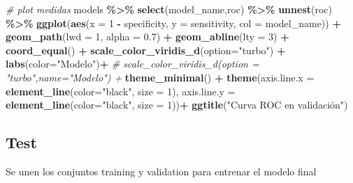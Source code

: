 \documentclass[12pt,a4paper,]{book}
\newenvironment{Shaded}{\begin{snugshade}}{\end{snugshade}}
\newcommand{\AttributeTok}[1]{\textcolor[rgb]{0.13,0.29,0.53}{#1}}
\newcommand{\CommentTok}[1]{\textcolor[rgb]{0.56,0.35,0.01}{\textit{#1}}}
\newcommand{\DecValTok}[1]{\textcolor[rgb]{0.00,0.00,0.81}{#1}}
\newcommand{\FloatTok}[1]{\textcolor[rgb]{0.00,0.00,0.81}{#1}}
\newcommand{\FunctionTok}[1]{\textcolor[rgb]{0.13,0.29,0.53}{\textbf{#1}}}
\newcommand{\NormalTok}[1]{#1}
\newcommand{\SpecialCharTok}[1]{\textcolor[rgb]{0.81,0.36,0.00}{\textbf{#1}}}
\newcommand{\StringTok}[1]{\textcolor[rgb]{0.31,0.60,0.02}{#1}}
\numberwithin{dummy}{section}
\theoremstyle{ocrenumbox}
\theoremstyle{blacknumex}
\theoremstyle{blacknumbox}
\theoremstyle{ocrenum}
\theoremstyle{ocrenum}
\begin{document}
\begin{Shaded}
\begin{Highlighting}[]
\CommentTok{\# plot medidas}
\NormalTok{models }\SpecialCharTok{\%\textgreater{}\%} \FunctionTok{select}\NormalTok{(model\_name,roc) }\SpecialCharTok{\%\textgreater{}\%} \FunctionTok{unnest}\NormalTok{(roc) }\SpecialCharTok{\%\textgreater{}\%} 
  \FunctionTok{ggplot}\NormalTok{(}\FunctionTok{aes}\NormalTok{(}\AttributeTok{x =} \DecValTok{1} \SpecialCharTok{{-}}\NormalTok{ specificity, }\AttributeTok{y =}\NormalTok{ sensitivity, }\AttributeTok{col =}\NormalTok{ model\_name)) }\SpecialCharTok{+} 
  \FunctionTok{geom\_path}\NormalTok{(}\AttributeTok{lwd =} \DecValTok{1}\NormalTok{, }\AttributeTok{alpha =} \FloatTok{0.7}\NormalTok{) }\SpecialCharTok{+}
  \FunctionTok{geom\_abline}\NormalTok{(}\AttributeTok{lty =} \DecValTok{3}\NormalTok{) }\SpecialCharTok{+} 
  \FunctionTok{coord\_equal}\NormalTok{() }\SpecialCharTok{+} 
  \FunctionTok{scale\_color\_viridis\_d}\NormalTok{(}\AttributeTok{option=}\StringTok{"turbo"}\NormalTok{) }\SpecialCharTok{+}
  \FunctionTok{labs}\NormalTok{(}\AttributeTok{color=}\StringTok{"Modelo"}\NormalTok{)}\SpecialCharTok{+}
  \CommentTok{\# scale\_color\_viridis\_d(option = "turbo",name="Modelo") +}
  \FunctionTok{theme\_minimal}\NormalTok{() }\SpecialCharTok{+} 
  \FunctionTok{theme}\NormalTok{(}\AttributeTok{axis.line.x =} \FunctionTok{element\_line}\NormalTok{(}\AttributeTok{color=}\StringTok{"black"}\NormalTok{, }\AttributeTok{size =} \DecValTok{1}\NormalTok{),}
        \AttributeTok{axis.line.y =} \FunctionTok{element\_line}\NormalTok{(}\AttributeTok{color=}\StringTok{"black"}\NormalTok{, }\AttributeTok{size =} \DecValTok{1}\NormalTok{))}\SpecialCharTok{+}
  \FunctionTok{ggtitle}\NormalTok{(}\StringTok{"Curva ROC en validación"}\NormalTok{)}
\end{Highlighting}
\end{Shaded}

\hypertarget{test-1}{%
\subsection{Test}\label{test-1}}

Se unen los conjuntos training y validation para entrenar el modelo
final
\end{document}
